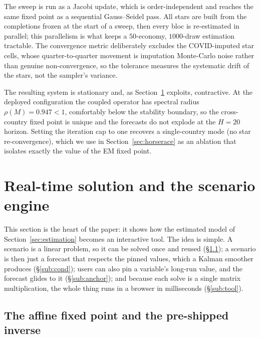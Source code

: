 \documentclass[11pt]{article}
\begin{document}
The sweep is run as a Jacobi update, which is order-independent and reaches the same fixed point as a
sequential Gauss--Seidel pass. All stars are built from the completions frozen at the start of a sweep,
then every bloc is re-estimated in parallel; this parallelism is what keeps a $50$-economy,
$1000$-draw estimation tractable. The convergence metric deliberately excludes the COVID-imputed
star cells, whose quarter-to-quarter movement is imputation Monte-Carlo noise rather than genuine
non-convergence, so the tolerance measures the systematic drift of the stars, not the sampler's variance.

The resulting system is stationary and, as Section~\ref{sec:engine} exploits, contractive. At the
deployed configuration the coupled operator has spectral radius $\rho(M)=0.947<1$, comfortably below the
stability boundary, so the cross-country fixed point is unique and the forecasts do not explode at the
$H=20$ horizon. Setting the iteration cap to one recovers a single-country mode (no star
re-convergence), which we use in Section~\ref{sec:horserace} as an ablation that isolates exactly the
value of the EM fixed point.

\section{Real-time solution and the scenario engine}
\label{sec:engine}

This section is the heart of the paper: it shows how the estimated model of
Section~\ref{sec:estimation} becomes an interactive tool. The idea is simple. A scenario is a linear
problem, so it can be solved once and reused (\S\ref{sub:affine}); a scenario is then just a forecast that
respects the pinned values, which a Kalman smoother produces (\S\ref{sub:cond}); users can also pin a
variable's long-run value, and the forecast glides to it (\S\ref{sub:anchor}); and because each solve is a
single matrix multiplication, the whole thing runs in a browser in milliseconds (\S\ref{sub:tool}).

\subsection{The affine fixed point and the pre-shipped inverse}
\label{sub:affine}
\end{document}
